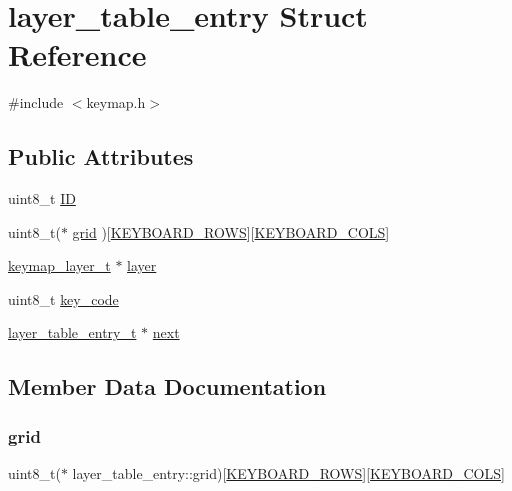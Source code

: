 \hypertarget{structlayer__table__entry}{}\section{layer\+\_\+table\+\_\+entry Struct Reference}
\label{structlayer__table__entry}


{\ttfamily \#include $<$keymap.\+h$>$}

\subsection*{Public Attributes}
\begin{DoxyCompactItemize}
\item 
uint8\+\_\+t \hyperlink{structlayer__table__entry_a1f5eedb697b3cc9b8e9a8a3509afcd48}{ID}
\item 
uint8\+\_\+t($\ast$ \hyperlink{structlayer__table__entry_aae6afffeffa358ff65580f7c5505c6de}{grid} )\mbox{[}\hyperlink{keymap_8h_ab89c69b09d4ca01020b7c40d9ca2bab8}{K\+E\+Y\+B\+O\+A\+R\+D\+\_\+\+R\+O\+WS}\mbox{]}\mbox{[}\hyperlink{keymap_8h_ada65ea6a2010790e481acf033b2f8351}{K\+E\+Y\+B\+O\+A\+R\+D\+\_\+\+C\+O\+LS}\mbox{]}
\item 
\hyperlink{keymap_8h_a09117a6f418904d4009f63e96c2b9b92}{keymap\+\_\+layer\+\_\+t} $\ast$ \hyperlink{structlayer__table__entry_ab47f15c7f3a4025f6c4f46fdaced1928}{layer}
\item 
uint8\+\_\+t \hyperlink{structlayer__table__entry_a5e005ec5b39090b44fd17e45a96b8981}{key\+\_\+code}
\item 
\hyperlink{keymap_8h_ab39f612aa4dc85545562fc906ed5f100}{layer\+\_\+table\+\_\+entry\+\_\+t} $\ast$ \hyperlink{structlayer__table__entry_a297619b520987d7dd119df4129aaf2ac}{next}
\end{DoxyCompactItemize}


\subsection{Member Data Documentation}
\mbox{\label{structlayer__table__entry_aae6afffeffa358ff65580f7c5505c6de}} 
\subsubsection{\texorpdfstring{grid}{grid}}
{\footnotesize\ttfamily uint8\+\_\+t($\ast$ layer\+\_\+table\+\_\+entry\+::grid)\mbox{[}\hyperlink{keymap_8h_ab89c69b09d4ca01020b7c40d9ca2bab8}{K\+E\+Y\+B\+O\+A\+R\+D\+\_\+\+R\+O\+WS}\mbox{]}\mbox{[}\hyperlink{keymap_8h_ada65ea6a2010790e481acf033b2f8351}{K\+E\+Y\+B\+O\+A\+R\+D\+\_\+\+C\+O\+LS}\mbox{]}}

